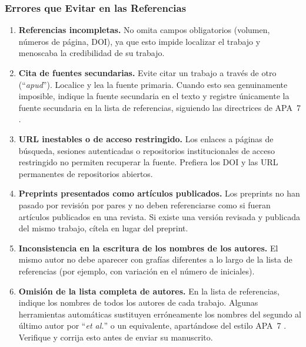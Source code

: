 \documentclass[spanish]{rbie2026}%
\begin{document}
\subsubsection{Errores que Evitar en las Referencias}

\begin{enumerate}
  \item \textbf{Referencias incompletas.} No omita campos obligatorios (volumen, números de página, DOI), ya que esto impide localizar el trabajo y menoscaba la credibilidad de su trabajo.

  \item \textbf{Cita de fuentes secundarias.} Evite citar un trabajo a través de otro (``\textit{apud}''). Localice y lea la fuente primaria. Cuando esto sea genuinamente imposible, indique la fuente secundaria en el texto y registre únicamente la fuente secundaria en la lista de referencias, siguiendo las directrices de APA~7 \citep{APAStyleTeam2020coronavirus}.

  \item \textbf{URL inestables o de acceso restringido.} Los enlaces a páginas de búsqueda, sesiones autenticadas o repositorios institucionales de acceso restringido no permiten recuperar la fuente. Prefiera los DOI y las URL permanentes de repositorios abiertos.

  \item \textbf{Preprints presentados como artículos publicados.} Los preprints no han pasado por revisión por pares y no deben referenciarse como si fueran artículos publicados en una revista. Si existe una versión revisada y publicada del mismo trabajo, cítela en lugar del preprint.

  \item \textbf{Inconsistencia en la escritura de los nombres de los autores.} El mismo autor no debe aparecer con grafías diferentes a lo largo de la lista de referencias (por ejemplo, con variación en el número de iniciales).

  \item \textbf{Omisión de la lista completa de autores.} En la lista de referencias, indique los nombres de todos los autores de cada trabajo. Algunas herramientas automáticas sustituyen erróneamente los nombres del segundo al último autor por ``\textit{et al.}'' o un equivalente, apartándose del estilo APA~7 \citep{APAStyleTeam2020coronavirus}. Verifique y corrija esto antes de enviar su manuscrito.
\end{enumerate}
\end{document}
